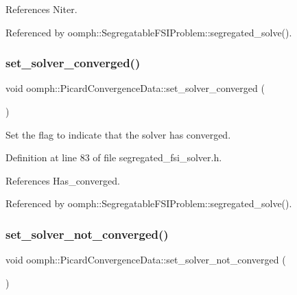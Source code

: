 References Niter.



Referenced by oomph\+::\+Segregatable\+F\+S\+I\+Problem\+::segregated\+\_\+solve().

\mbox{\label{classoomph_1_1PicardConvergenceData_a181a6b365fb045cd70e30f193542d087}} 
\subsubsection{\texorpdfstring{set\+\_\+solver\+\_\+converged()}{set\_solver\_converged()}}
{\footnotesize\ttfamily void oomph\+::\+Picard\+Convergence\+Data\+::set\+\_\+solver\+\_\+converged (\begin{DoxyParamCaption}{ }\end{DoxyParamCaption})\hspace{0.3cm}{\ttfamily [inline]}}



Set the flag to indicate that the solver has converged. 



Definition at line 83 of file segregated\+\_\+fsi\+\_\+solver.\+h.



References Has\+\_\+converged.



Referenced by oomph\+::\+Segregatable\+F\+S\+I\+Problem\+::segregated\+\_\+solve().

\mbox{\label{classoomph_1_1PicardConvergenceData_a1fcaf97b61a9afa18b569a8ca43b1454}} 
\subsubsection{\texorpdfstring{set\+\_\+solver\+\_\+not\+\_\+converged()}{set\_solver\_not\_converged()}}
{\footnotesize\ttfamily void oomph\+::\+Picard\+Convergence\+Data\+::set\+\_\+solver\+\_\+not\+\_\+converged (\begin{DoxyParamCaption}{ }\end{DoxyParamCaption})\hspace{0.3cm}{\ttfamily [inline]}}



